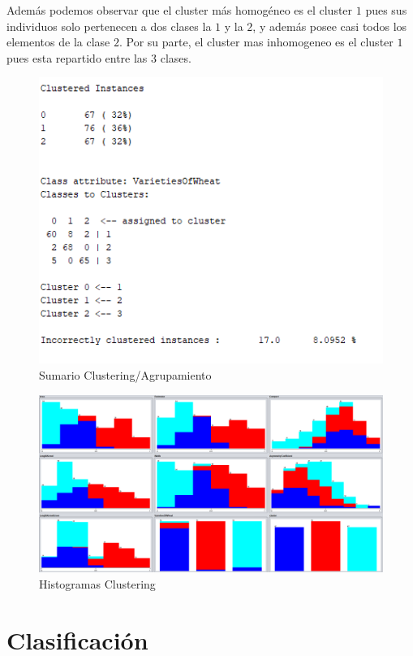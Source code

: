 \documentclass[a4paper, 11pt, twoside, openany, onecolumn, final]{memoir}
\begin{document}
Además podemos observar que el cluster más homogéneo es el cluster $1$ pues sus individuos solo pertenecen a dos clases la $1$ y la $2$, y además posee casi todos los elementos de la clase $2$. Por su parte, el cluster mas inhomogeneo es el cluster $1$ pues esta repartido entre las $3$ clases. 


	\begin{figure}
  		\centering
   		\includegraphics{Imagenes/SumarioClustering}
  		\caption{Sumario Clustering/Agrupamiento}
  		\label{SumarioClustering}
	\end{figure}	
	
	\begin{figure}
  		\centering
   		\includegraphics[width=1\textwidth]{Imagenes/Clustering}
  		\caption{Histogramas Clustering}
  		\label{ClusteringHistogramas}
	\end{figure}
\chapter{Clasificación}
\end{document}
